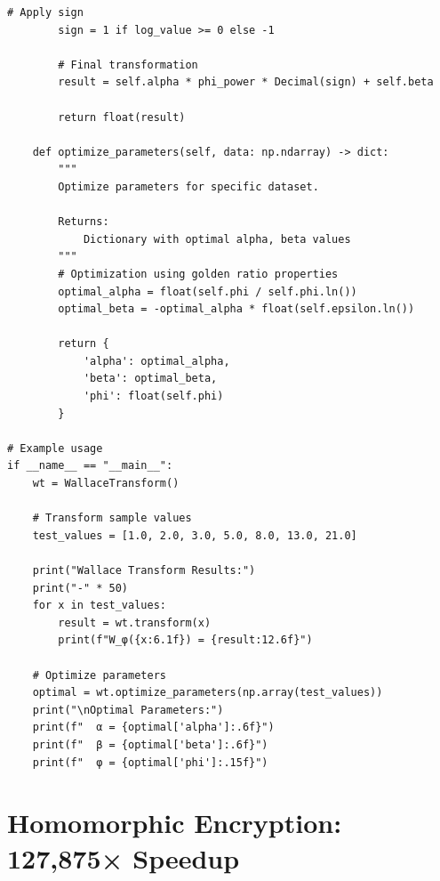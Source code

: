 \begin{lstlisting}[caption={Complete Wallace Transform Implementation},label={code:wallace_transform}]
        # Apply sign
        sign = 1 if log_value >= 0 else -1
        
        # Final transformation
        result = self.alpha * phi_power * Decimal(sign) + self.beta
        
        return float(result)
    
    def optimize_parameters(self, data: np.ndarray) -> dict:
        """
        Optimize parameters for specific dataset.
        
        Returns:
            Dictionary with optimal alpha, beta values
        """
        # Optimization using golden ratio properties
        optimal_alpha = float(self.phi / self.phi.ln())
        optimal_beta = -optimal_alpha * float(self.epsilon.ln())
        
        return {
            'alpha': optimal_alpha,
            'beta': optimal_beta,
            'phi': float(self.phi)
        }

# Example usage
if __name__ == "__main__":
    wt = WallaceTransform()
    
    # Transform sample values
    test_values = [1.0, 2.0, 3.0, 5.0, 8.0, 13.0, 21.0]
    
    print("Wallace Transform Results:")
    print("-" * 50)
    for x in test_values:
        result = wt.transform(x)
        print(f"W_φ({x:6.1f}) = {result:12.6f}")
    
    # Optimize parameters
    optimal = wt.optimize_parameters(np.array(test_values))
    print("\nOptimal Parameters:")
    print(f"  α = {optimal['alpha']:.6f}")
    print(f"  β = {optimal['beta']:.6f}")
    print(f"  φ = {optimal['phi']:.15f}")
\end{lstlisting}

\section{Homomorphic Encryption: 127,875× Speedup}

